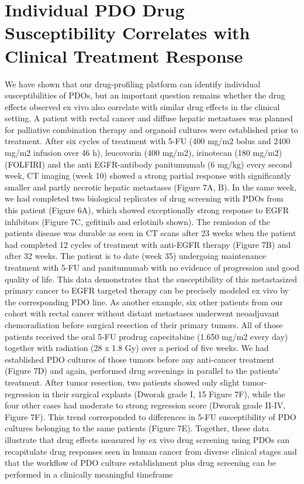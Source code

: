 \section{Individual PDO Drug Susceptibility Correlates with Clinical Treatment Response}

We have shown that our drug-profiling platform can identify individual susceptibilities of PDOs, but an important question remains whether the drug effects observed ex vivo also correlate with similar drug effects in the clinical setting. A patient with rectal cancer and diffuse hepatic metastases was planned for palliative combination therapy and organoid cultures were established prior to treatment. After six cycles of treatment with 5-FU (400 mg/m2 bolus and 2400 mg/m2 infusion over 46 h), leucovorin (400 mg/m2), irinotecan (180 mg/m2) (FOLFIRI) and the anti EGFR-antibody panitumumab (6 mg/kg) every second week, CT imaging (week 10) showed a strong partial response with significantly smaller and partly necrotic hepatic metastases (Figure 7A, B). In the same week, we had completed two biological replicates of drug screening with PDOs from this patient (Figure 6A), which showed exceptionally strong response to EGFR inhibitors (Figure 7C, gefitinib and erlotinib shown). The remission of the patients disease was durable as seen in CT scans after 23 weeks when the patient had completed 12 cycles of treatment with anti-EGFR therapy (Figure 7B) and after 32 weeks. The patient is to date (week 35) undergoing maintenance treatment with 5-FU and panitumumab with no evidence of progression and good quality of life. This data demonstrates that the susceptibility of this metastasized primary cancer to EGFR targeted therapy can be precisely modeled ex vivo by the corresponding PDO line.
As another example, six other patients from our cohort with rectal cancer without distant metastases underwent neoadjuvant chemoradiation before surgical resection of their primary tumors. All of those patients received the oral 5-FU prodrug capecitabine (1.650 mg/m2 every day) together with radiation (28 x 1.8 Gy) over a period of five weeks. We had established PDO cultures of those tumors before any anti-cancer treatment (Figure 7D) and again, performed drug screenings in parallel to the patients’ treatment. After tumor resection, two patients showed only slight tumor-regression in their surgical explants (Dworak grade I,
15
Figure 7F), while the four other cases had moderate to strong regression score (Dworak grade II-IV, Figure 7F). This trend corresponded to differences in 5-FU susceptibility of PDO cultures belonging to the same patients (Figure 7E).
Together, these data illustrate that drug effects measured by ex vivo drug screening using PDOs can recapitulate drug responses seen in human cancer from diverse clinical stages and that the workflow of PDO culture establishment plus drug screening can be performed in a clinically meaningful timeframe


